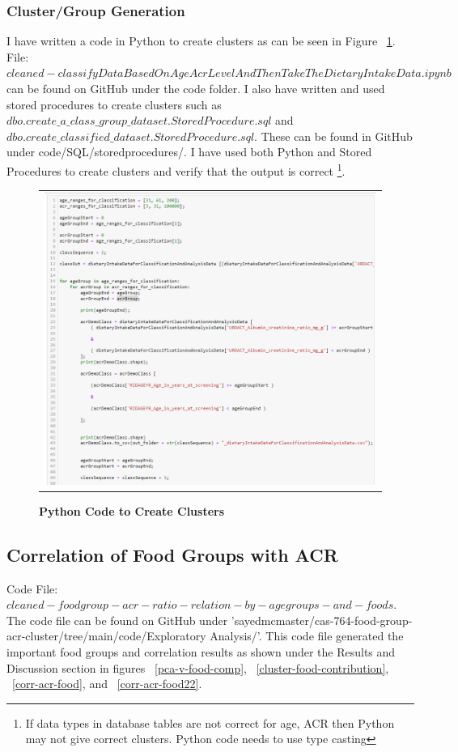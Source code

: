 \subsubsection {Cluster/Group Generation}
I have written a code in Python to create clusters as can be seen in Figure ~\ref{python-cluster}.
File: $cleaned-classifyDataBasedOnAgeAcrLevelAndThenTakeTheDietaryIntakeData.ipynb$ can be found on GitHub under the code folder. I also have written and used stored procedures to create clusters such as
$dbo.create\_a\_class\_group\_dataset.StoredProcedure.sql$ and $dbo.create\_classified\_dataset.StoredProcedure.sql$. These can be found in GitHub under code/SQL/storedprocedures/. I have used both Python and Stored Procedures to create clusters and verify that the output is correct \footnote{If data types in database tables are not correct for age, ACR then Python may not give correct clusters. Python code needs to use type casting}.

\begin{figure}[!htb]
\begin{tabular}{c}
\includegraphics[scale=0.8]{images/datasetgenerationcode/cluster-python-code.png} \\
\end{tabular}
\caption{\textbf{Python Code to Create Clusters}}
\label{python-cluster}
\vspace{0.25cm}
\end{figure}


\subsection{Correlation of Food Groups with ACR}
Code File: $cleaned-foodgroup-acr-ratio-relation-by-agegroups-and-foods$. The code file can be found on GitHub under 'sayedmcmaster/cas-764-food-group-acr-cluster/tree/main/code/Exploratory Analysis/'. This code file generated the important food groups and correlation results as shown under the Results and Discussion section in figures ~\ref{pca-v-food-comp}, ~\ref{cluster-food-contribution}, ~\ref{corr-acr-food}, and ~\ref{corr-acr-food22}.

